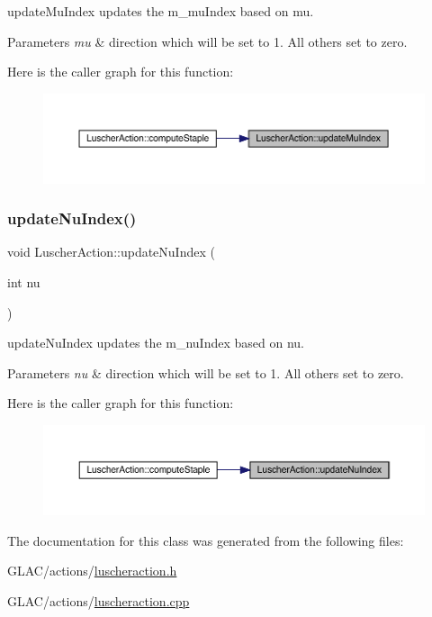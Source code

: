 update\+Mu\+Index updates the m\+\_\+mu\+Index based on mu. 


\begin{DoxyParams}{Parameters}
{\em mu} & direction which will be set to 1. All others set to zero. \\
\hline
\end{DoxyParams}
Here is the caller graph for this function\+:\nopagebreak
\begin{figure}[H]
\begin{center}
\leavevmode
\includegraphics[width=350pt]{class_luscher_action_a2bfa5f9b8bfb0c4440732000d2281519_icgraph}
\end{center}
\end{figure}
\mbox{\label{class_luscher_action_a6496c97ed38401c0d94855bf940fd6ff}} 
\subsubsection{\texorpdfstring{updateNuIndex()}{updateNuIndex()}}
{\footnotesize\ttfamily void Luscher\+Action\+::update\+Nu\+Index (\begin{DoxyParamCaption}\item[{int}]{nu }\end{DoxyParamCaption})\hspace{0.3cm}{\ttfamily [inline]}}



update\+Nu\+Index updates the m\+\_\+nu\+Index based on nu. 


\begin{DoxyParams}{Parameters}
{\em nu} & direction which will be set to 1. All others set to zero. \\
\hline
\end{DoxyParams}
Here is the caller graph for this function\+:\nopagebreak
\begin{figure}[H]
\begin{center}
\leavevmode
\includegraphics[width=350pt]{class_luscher_action_a6496c97ed38401c0d94855bf940fd6ff_icgraph}
\end{center}
\end{figure}


The documentation for this class was generated from the following files\+:\begin{DoxyCompactItemize}
\item 
G\+L\+A\+C/actions/\mbox{\hyperlink{luscheraction_8h}{luscheraction.\+h}}\item 
G\+L\+A\+C/actions/\mbox{\hyperlink{luscheraction_8cpp}{luscheraction.\+cpp}}\end{DoxyCompactItemize}
